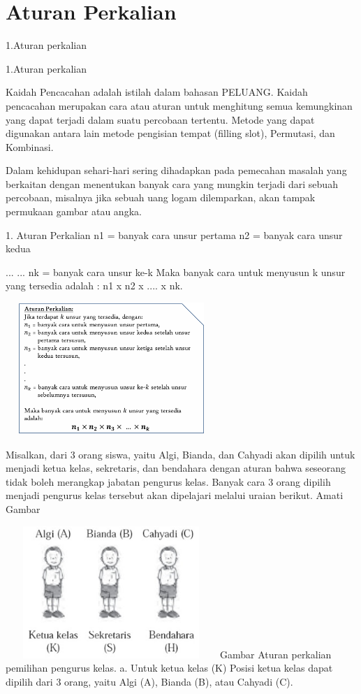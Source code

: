 \documentclass[11pt,fleqn]{book} %
\begin{document}


\section{Aturan Perkalian}

1.Aturan perkalian

1.Aturan perkalian

	Kaidah Pencacahan adalah istilah dalam bahasan PELUANG. Kaidah pencacahan merupakan cara atau aturan untuk menghitung semua kemungkinan yang dapat terjadi dalam suatu percobaan tertentu. Metode yang dapat digunakan antara lain metode pengisian tempat (filling slot), Permutasi, dan Kombinasi. 

	Dalam kehidupan sehari-hari sering dihadapkan pada pemecahan masalah yang berkaitan dengan menentukan banyak cara yang mungkin terjadi dari sebuah percobaan, misalnya jika sebuah uang logam dilemparkan, akan tampak permukaan gambar atau angka. 



1. Aturan Perkalian
n1 = banyak cara unsur pertama
n2 = banyak cara unsur kedua

...
...
nk = banyak cara unsur ke-k
Maka banyak cara untuk menyusun k unsur yang tersedia adalah :
n1 x n2 x .... x nk.



\includegraphics[width = 8cm, height= 5cm]{Pictures/materikaidah1.png}

 Misalkan, dari 3 orang siswa, yaitu Algi, Bianda, dan Cahyadi akan dipilih untuk menjadi ketua kelas, sekretaris, dan bendahara dengan aturan bahwa seseorang tidak boleh merangkap jabatan pengurus kelas. Banyak cara 3 orang dipilih menjadi pengurus kelas tersebut akan dipelajari melalui uraian berikut. Amati Gambar
 
 \includegraphics[width = 8cm, height= 5cm]{Pictures/gen1.png}
Gambar  Aturan perkalian pemilihan pengurus kelas.
a. Untuk ketua kelas (K)
 Posisi ketua kelas dapat dipilih dari 3 orang, yaitu Algi  (A), Bianda (B), atau Cahyadi (C).
\end{document}
